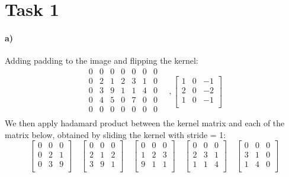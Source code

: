 \documentclass{article}
\begin{document}
\section*{Task 1}
\paragraph{a)}
Adding padding to the image and flipping the kernel:
\[
	\begin{matrix}
		0 & 0 & 0 & 0 & 0 & 0 & 0 \\
		0 & 2 & 1 & 2 & 3 & 1 & 0 \\
		0 & 3 & 9 & 1 & 1 & 4 & 0 \\
		0 & 4 & 5 & 0 & 7 & 0 & 0 \\
		0 & 0 & 0 & 0 & 0 & 0 & 0 \\
	\end{matrix}
	\quad,
	\begin{bmatrix}
		1 & 0 & -1 \\
		2 & 0 & -2 \\
		1 & 0 & -1 \\
	\end{bmatrix}
\]
We then apply hadamard product between the kernel matrix and each of the matrix below, obtained by sliding the kernel with stride = 1:
\[
	\begin{bmatrix}
		0 & 0 & 0 \\
		0 & 2 & 1 \\
		0 & 3 & 9 \\
	\end{bmatrix}
	\quad
	\begin{bmatrix}
		0 & 0 & 0 \\
		2 & 1 & 2 \\
		3 & 9 & 1 \\
	\end{bmatrix}
	\quad
	\begin{bmatrix}
		0 & 0 & 0 \\
		1 & 2 & 3 \\
		9 & 1 & 1 \\
	\end{bmatrix}
	\quad
	\begin{bmatrix}
		0 & 0 & 0 \\
		2 & 3 & 1 \\
		1 & 1 & 4 \\
	\end{bmatrix}
	\quad
	\begin{bmatrix}
		0 & 0 & 0 \\
		3 & 1 & 0 \\
		1 & 4 & 0 \\
	\end{bmatrix}
\]
\end{document}
